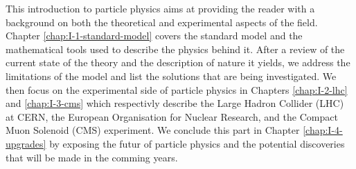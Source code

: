 This introduction to particle physics aims at providing the reader with a background on both the theoretical and experimental aspects of the field. Chapter \ref{chap:I-1-standard-model} covers the standard model and the mathematical tools used to describe the physics behind it. After a review of the current state of the theory and the description of nature it yields, we address the limitations of the model and list the solutions that are being investigated. We then focus on the experimental side of particle physics in Chapters \ref{chap:I-2-lhc} and \ref{chap:I-3-cms} which respectivly describe the Large Hadron Collider (LHC) at CERN, the European Organisation for Nuclear Research, and the Compact Muon Solenoid (CMS) experiment. We conclude this part in Chapter \ref{chap:I-4-upgrades} by exposing the futur of particle physics and the potential discoveries that will be made in the comming years.
